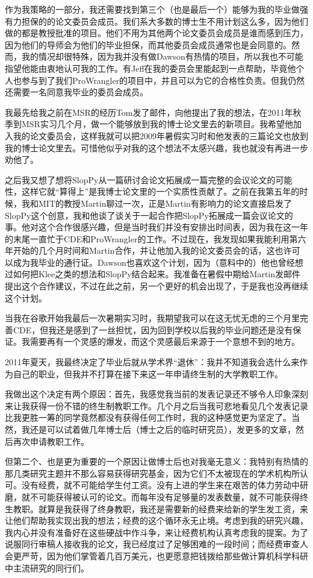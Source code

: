 \documentclass[letter,12pt]{book}
\begin{document}
\begin{CJK}{UTF8}{gbsn}
作为我策略的一部分，我还需要找到第三个（也是最后一个）能够为我的毕业做强有力担保的的论文委员会成员。我们系大多数的博士生不用计划这么多，因为他们做的都是教授批准的项目。他们不用为其他两个论文委员会成员是谁而感到压力，因为他们的导师会为他们的毕业担保，而其他委员会成员通常也是会同意的。然而，我的情况却很特殊，因为我并没有做Dawson有热情的项目，所以我也不可能指望他能由衷地认可我的工作。有Jeff在我的委员会里能起到一点帮助，毕竟他个人也参与到了我们ProWrangler的项目中，并且可以为它的合格性负责。但我仍然还需要一名同意我毕业的委员会成员。

我最先给我之前在MSR的经历Tom发了邮件，向他提出了我的想法，在2011年秋季到MSR实习几个月，做一个能够放到我的博士论文里去的新项目。我希望他加入我的论文委员会，这样我就可以把2009年暑假实习时和他发表的三篇论文也放到我的博士论文里去。可惜他似乎对我的这个想法不太感兴趣，我也就没有再进一步劝他了。

之后我又想了想将SlopPy从一篇研讨会论文拓展成一篇完整的会议论文的可能性，这样它就“算得上”是我博士论文里的一个实质性贡献了。之前在我第五年的时候，我和MIT的教授Martin聊过一次，正是Martin有影响力的论文直接启发了SlopPy这个创意，我和他谈了谈关于一起合作把SlopPy拓展成一篇会议论文的事。他对这个合作很感兴趣，但是当时我们并没有安排出时间表，因为我在这一年的末尾一直忙于CDE和ProWrangler的工作。不过现在，我发现如果我能利用第六年开始的几个月时间和Martin合作，并让他加入我的论文委员会的话，这也许可以成为我毕业的通行证。Dawson也喜欢这个计划，因为（意料中的）他也曾经想过如何把Klee之类的想法和SlopPy结合起来。我准备在暑假中期给Martin发邮件提出这个合作建议，不过在此之前，另一个更好的机会出现了，于是我也没再继续这个计划。

当我在谷歌开始我最后一次暑期实习时，我期望我可以在这无忧无虑的三个月里完善CDE，但我还是感到了一丝担忧，因为回到学校以后我的毕业问题还是没有保证。我需要再有一个灵感的爆发，而这个灵感最后来源于一个意想不到的地方。

\breakline

2011年夏天，我最终决定了毕业后就从学术界“退休”：我并不知道我会选什么来作为自己的职业，但我并不打算在接下来这一年申请终生制的大学教职工作。

我做出这个决定有两个原因：首先，我感觉我当前的发表记录还不够令人印象深刻来让我获得一份不错的终生制教职工作。几个月之后当我可悲地看见几个发表记录比我更胜一筹的同学竟然都没有获得任何工作时，我的这种感觉更为坚定了。当然，我还是可以试着做几年博士后（博士之后的临时研究员），发更多的文章，然后再次申请教职工作。

但第二个、也是更为重要的一个原因让做博士后也对我毫无意义：我特别有热情的那几类研究主题并不那么容易获得研究基金，因为它们不太被现在的学术机构所认可。没有经费，就不可能给学生付工资。没有上进的学生来在艰苦的体力劳动中研磨，就不可能获得被认可的论文。而每年没有足够量的发表数量，就不可能获得终生教职。就算是我获得了终身教职，我还是需要新的经费来给新的学生发工资，来让他们帮助我实现出我的想法；经费的这个循环永无止境。考虑到我的研究兴趣，我内心并没有准备好在这些硬战中作斗争，来让经费机构认真考虑我的提案。为了说服同行审稿人接收我的论文，我已经度过了足够困难的一段时间；而经费审查人会更严苛，因为他们掌管着几百万美元，也更愿意把钱拨给那些做计算机科学科研中主流研究的同行们。


\end{CJK}
\end{document}
